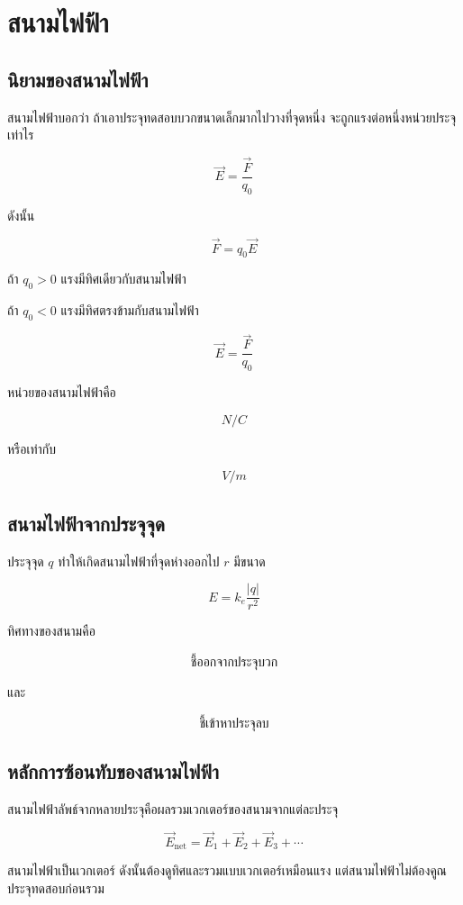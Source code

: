 \section{สนามไฟฟ้า}

\subsection{นิยามของสนามไฟฟ้า}

สนามไฟฟ้าบอกว่า ถ้าเอาประจุทดสอบบวกขนาดเล็กมากไปวางที่จุดหนึ่ง จะถูกแรงต่อหนึ่งหน่วยประจุเท่าไร

\[
\vec{E}=\frac{\vec{F}}{q_0}
\]

ดังนั้น

\[
\vec{F}=q_0\vec{E}
\]

ถ้า $q_0>0$ แรงมีทิศเดียวกับสนามไฟฟ้า

ถ้า $q_0<0$ แรงมีทิศตรงข้ามกับสนามไฟฟ้า

\begin{tcolorbox}[title=นิยามสนามไฟฟ้า]
\[
\vec{E}=\frac{\vec{F}}{q_0}
\]

หน่วยของสนามไฟฟ้าคือ

\[
\si{N/C}
\]

หรือเท่ากับ

\[
\si{V/m}
\]
\end{tcolorbox}

\subsection{สนามไฟฟ้าจากประจุจุด}

ประจุจุด $q$ ทำให้เกิดสนามไฟฟ้าที่จุดห่างออกไป $r$ มีขนาด

\[
E=k_e\frac{|q|}{r^2}
\]

ทิศทางของสนามคือ

\[
\text{ชี้ออกจากประจุบวก}
\]

และ

\[
\text{ชี้เข้าหาประจุลบ}
\]

\subsection{หลักการซ้อนทับของสนามไฟฟ้า}

สนามไฟฟ้าลัพธ์จากหลายประจุคือผลรวมเวกเตอร์ของสนามจากแต่ละประจุ

\[
\vec{E}_{\text{net}}=\vec{E}_1+\vec{E}_2+\vec{E}_3+\cdots
\]

\begin{tcolorbox}[title=ข้อควรจำ]
สนามไฟฟ้าเป็นเวกเตอร์ ดังนั้นต้องดูทิศและรวมแบบเวกเตอร์เหมือนแรง แต่สนามไฟฟ้าไม่ต้องคูณประจุทดสอบก่อนรวม
\end{tcolorbox}

